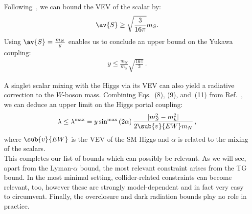 Following~\cite{Robens:2015gla}, we can bound the VEV of the scalar by:
\begin{align}
 \av{S} \geq \sqrt{\frac{3}{16 \pi}} m_S.
 \label{eq:PerturbativeUnitarity}
\end{align}
Using $\av{S} = \frac{m_N}{y}$ enables us to conclude an upper bound on the Yukawa coupling:
\begin{align}
 y \leq \frac{m_N}{m_S} \sqrt{\frac{16\pi}{3}} \,.
 \label{eq:PerturbativeUnitarity2}
\end{align}

A singlet scalar mixing with the Higgs via its VEV can also yield a radiative correction to the $W$-boson mass. Combining Eqs.~(8), (9), and~(11) from Ref.~\cite{Robens:2015gla}, we can deduce an upper limit on the Higgs portal coupling:
\begin{align}
 \lambda \leq \lambda^{\mathrm{max}} = y \sin^{\mathrm{max}}\left(2\alpha\right) \frac{|m_S^2 -m_h^2|}{2\sub{v}{EW} m_N} \,,
 \label{eq:W-mass-bound}
\end{align}
where $\sub{v}{EW}$ is the VEV of the SM-Higgs and $\alpha$ is related to the mixing of the scalars.\\

This completes our list of bounds which can possibly be relevant. As we will see, apart from the Lyman-$\alpha$ bound, the most relevant constraint arises from the TG bound. In the most minimal setting, collider-related constraints can become relevant, too, however these are strongly model-dependent and in fact very easy to circumvent. Finally, the overclosure and dark radiation bounds play no role in practice.



